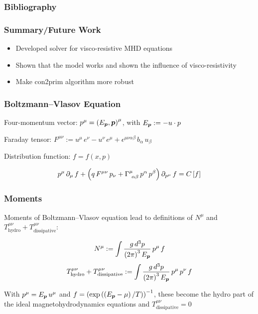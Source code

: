 \documentclass{beamer}
\begin{document}
\begin{frame}
\frametitle{Bibliography}

  \Fontvi
  

\end{frame}

\begin{frame}
\frametitle{Summary/Future Work}
  \begin{itemize}
    \item
      Developed solver for visco-resistive MHD equations
    \item
      Shown that the model works and shown the influence of visco-resistivity 
    \item
      Make con2prim algorithm more robust
  \end{itemize}
\end{frame}

\appendix

\begin{frame}
\frametitle{Boltzmann--Vlasov Equation}

  Four-momentum vector: $p^{\mu} = \left( E_{\boldsymbol{p}}, \boldsymbol{p} \right)^{\mu}$,
  with $E_{\boldsymbol{p}} := - u \cdot p$ \newline

  Faraday tensor: $F^{\mu\nu} := u^{\mu} \, e^{\nu} - u^{\nu} \, e^{\mu}
                     + \epsilon^{\mu\nu\alpha\beta} \, b_{\alpha} \, u_{\beta}$
  \newline

  Distribution function: $f = f\left( x, p \right)$

  \begin{equation}
    p^{\mu} \, \partial_{\mu} \, f
      + \left( q \, F^{\mu\nu} \, p_{\nu}
      + \Gamma^{\mu}_{~\alpha\beta} \, p^{\alpha} \, p^{\beta} \right)
      \partial_{p^{\mu}} \, f = C\left[ f \right]
  \end{equation}
  \cite{most2022}

\end{frame}

\begin{frame}
\frametitle{Moments}

  Moments of Boltzmann--Vlasov equation
  lead to definitions of $N^{\mu}$ and $T^{\mu\nu}_{\mathrm{hydro}}
  + T^{\mu\nu}_{\mathrm{dissipative}}$:

  \begin{equation}
    N^{\mu} := \int \frac{g \, d^{3}p}{\left(2\pi\right)^{3} E_{\boldsymbol{p}}} \,
    p^{\mu} \, f
  \end{equation}
  \begin{equation}
    T^{\mu\nu}_{\mathrm{hydro}} + T^{\mu\nu}_{\mathrm{dissipative}}
    := \int \frac{g \, d^{3}p}{\left(2\pi\right)^{3} E_{\boldsymbol{p}}} \,
    p^{\mu} \, p^{\nu} \, f
  \end{equation}
  \cite{denicol2019}\newline

  With $p^{\mu} = E_{\boldsymbol{p}} \, u^{\mu}$ and
  $f = \left( \exp \left( \left( E_{\boldsymbol{p}} - \mu \right) / T \right) \right)^{-1}$,
  these become the hydro part of the ideal magnetohydrodynamics equations
  and $T^{\mu\nu}_{\mathrm{dissipative}} = 0$

\end{frame}
\end{document}
